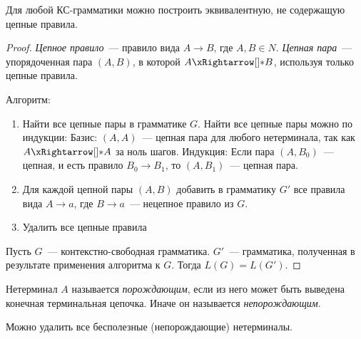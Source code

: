 \begin{lemma}
    Для любой КС-грамматики можно построить эквивалентную, не содержащую цепные правила.
\end{lemma}

\begin{proof}
    \emph{Цепное правило}~--- правило вида $A \to B\text{, где } A, B \in N$.
    \emph{Цепная пара}~--- упорядоченная пара $(A,B)$, в которой $A\derives B$, используя только цепные правила.

    Алгоритм:
    \begin{enumerate}
        \item Найти все цепные пары в грамматике $G$.
              Найти все цепные пары можно по индукции:
              Базис: $(A,A)$~--- цепная пара для любого нетерминала, так как $A\derives A$ за ноль шагов.
              Индукция: Если пара $(A,B_0)$~--- цепная, и есть правило $B_0 \to B_1$, то $(A,B_1)$~--- цепная пара.
        \item Для каждой цепной пары $(A,B)$ добавить в грамматику $G'$ все правила вида $A \to a$, где $B \to a$~--- нецепное правило из $G$.
        \item Удалить все цепные правила
    \end{enumerate}
    Пусть $G$~--- контекстно-свободная грамматика. $G'$~--- грамматика, полученная в результате применения алгоритма к $G$. Тогда $L(G)=L(G')$.
\end{proof}

\begin{definition}
    Нетерминал $A$ называется \emph{порождающим}, если из него может быть выведена конечная терминальная цепочка.
    Иначе он называется \emph{непорождающим}.
\end{definition}

\begin{lemma}
    Можно удалить все бесполезные (непорождающие) нетерминалы.
\end{lemma}

